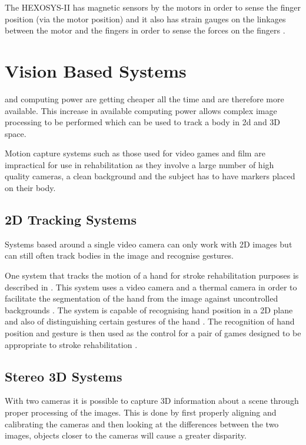 \documentclass[journal]{IEEEtran}
\begin{document}
The HEXOSYS-II has magnetic sensors by the motors in order to sense the finger position (via 
the motor position) and it also has strain gauges on the linkages between the motor and the fingers 
in order to sense the forces on the fingers \cite{HandExo}.

\section{Vision Based Systems}
 and computing power are getting cheaper all the time and are therefore 
more available. This increase in available computing power allows complex image processing to be performed 
which can be used to track a body in 2d and 3D space.

Motion capture systems such as those used for video games and film are impractical for use in 
rehabilitation as they involve a large number of high quality cameras, a clean background and 
the subject has to have markers placed on their body.

\subsection{2D Tracking Systems}
Systems based around a single video camera can only work with 2D images but can still often track 
bodies in the image and recognise gestures.

One system that tracks the motion of a hand for stroke rehabilitation purposes is described in \cite{SeriousGames}. 
This system uses a video camera and a thermal camera in order to facilitate the segmentation of the hand from the 
image against uncontrolled backgrounds \cite{SeriousGames}. The system is capable of recognising hand position 
in a 2D plane and also of distinguishing certain gestures of the hand \cite{SeriousGames}. The recognition 
of hand position and gesture is then used as the control for a pair of games designed to be appropriate to 
stroke rehabilitation \cite{SeriousGames}.

\subsection{Stereo 3D Systems}
With two cameras it is possible to capture 3D information about a scene through proper processing of the 
images. This is done by first properly aligning and calibrating the cameras and then looking at the differences 
between the two images, objects closer to the cameras will cause a greater disparity.
\end{document}
